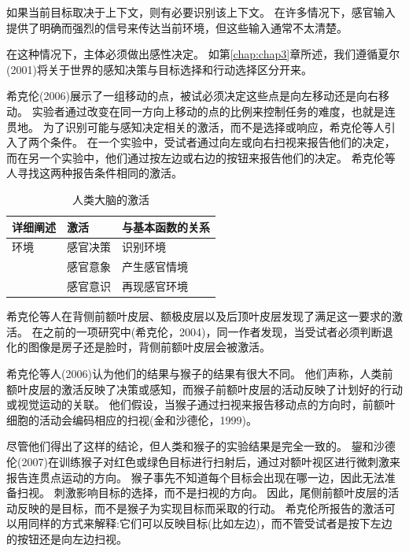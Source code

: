 如果当前目标取决于上下文，则有必要识别该上下文。
在许多情况下，感官输入提供了明确而强烈的信号来传达当前环境，但这些输入通常不太清楚。


在这种情况下，主体必须做出感性决定。
如第\ref{chap:chap3}章所述，我们遵循夏尔(2001)将关于世界的感知决策与目标选择和行动选择区分开来。


希克伦(2006)展示了一组移动的点，被试必须决定这些点是向左移动还是向右移动。
实验者通过改变在同一方向上移动的点的比例来控制任务的难度，也就是连贯地。
为了识别可能与感知决定相关的激活，而不是选择或响应，希克伦等人引入了两个条件。
在一个实验中，受试者通过向左或向右扫视来报告他们的决定，而在另一个实验中，他们通过按左边或右边的按钮来报告他们的决定。
希克伦等人寻找这两种报告条件相同的激活。
\par


\begin{table}[htbp] 
	\newcommand{\tabincell}[2]{\begin{tabular}{@{}#1@{}}#2\end{tabular}} %
	\centering
	\caption{人类大脑的激活\label{tab:9_1}}
	\renewcommand\arraystretch{1.5}	%
	\begin{tabular}{lll}
		\toprule
		详细阐述 & 激活 & 与基本函数的关系\\
		\midrule
		 环境& 感官决策 & 识别环境  \\
		 & 感官意象 & 产生感官情境 \\
		&  感官意识 & 再现感官环境\\
				\bottomrule
	
	\end{tabular}%
\end{table}%


希克伦等人在背侧前额叶皮层、额极皮层以及后顶叶皮层发现了满足这一要求的激活。
在之前的一项研究中(希克伦，2004)，同一作者发现，当受试者必须判断退化的图像是房子还是脸时，背侧前额叶皮层会被激活。
\par


希克伦等人(2006)认为他们的结果与猴子的结果有很大不同。
他们声称，人类前额叶皮层的激活反映了决策或感知，而猴子前额叶皮层的活动反映了计划好的行动或视觉运动的关联。
他们假设，当猴子通过扫视来报告移动点的方向时，前额叶细胞的活动会编码相应的扫视(金和沙德伦，1999)。
\par


尽管他们得出了这样的结论，但人类和猴子的实验结果是完全一致的。
鋆和沙德伦(2007)在训练猴子对红色或绿色目标进行扫射后，通过对额叶视区进行微刺激来报告连贯点运动的方向。
猴子事先不知道每个目标会出现在哪一边，因此无法准备扫视。
刺激影响目标的选择，而不是扫视的方向。
因此，尾侧前额叶皮层的活动反映的是目标，而不是猴子为实现目标而采取的行动。
希克伦所报告的激活可以用同样的方式来解释:它们可以反映目标(比如左边)，而不管受试者是按下左边的按钮还是向左边扫视。
\par


